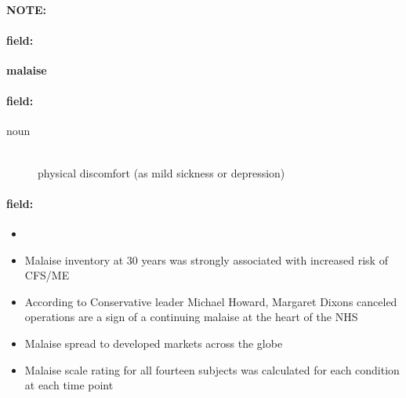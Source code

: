 \documentclass[12pt]{article}
\newenvironment{note}{\paragraph{NOTE:}}{}
\newenvironment{field}{\paragraph{field:}}{}
\begin{document}
\begin{note}
\begin{field}
\textbf{\large malaise}
\end{field}


\begin{field}
\begin{description}
\item[noun] \hfill \\ 
physical discomfort (as mild sickness or depression)

\end{description}
\end{field}

\begin{field}
\begin{itemize}
\item 
\item Malaise inventory at 30 years was strongly associated with increased risk of CFS/ME
\item According to Conservative leader Michael Howard, Margaret Dixons canceled operations are a sign of a continuing malaise at the heart of the NHS
\item Malaise spread to developed markets across the globe
\item Malaise scale rating for all fourteen subjects was calculated for each condition at each time point
\end{itemize}
\end{field}
\end{note}
\end{document}
